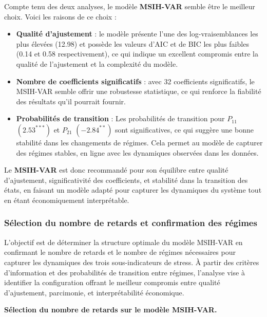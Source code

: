 Compte tenu des deux analyses, le modèle \textbf{MSIH-VAR} semble être le meilleur choix. Voici les raisons de ce choix :

\begin{itemize}
    \item \textbf{Qualité d'ajustement} : le modèle présente l'une des log-vraisemblances les plus élevées (12.98) et possède les valeurs d'AIC et de BIC les plus faibles (0.14 et 0.58 respectivement), ce qui indique un excellent compromis entre la qualité de l'ajustement et la complexité du modèle.

    \item \textbf{Nombre de coefficients significatifs} : avec 32 coefficients significatifs, le MSIH-VAR semble offrir une robustesse statistique, ce qui renforce la fiabilité des résultats qu'il pourrait fournir.

    \item \textbf{Probabilités de transition} : Les probabilités de transition pour \( P_{11} \) \( (2.53^{***}) \) et \( P_{21} \)  \( (-2.84^{**}) \) sont significatives, ce qui suggère une bonne stabilité dans les changements de régimes. Cela permet au modèle de capturer des régimes stables, en ligne avec les dynamiques observées dans les données.
\end{itemize}

Le \textbf{MSIH-VAR} est donc recommandé pour son équilibre entre qualité d’ajustement, significativité des coefficients, et stabilité dans la transition des états, en faisant un modèle adapté pour capturer les dynamiques du système tout en étant économiquement interprétable.\\

\subsubsection{Sélection du nombre de retards et confirmation des régimes}

L’objectif est de déterminer la structure optimale du modèle MSIH-VAR en confirmant le nombre de retards et le nombre de régimes nécessaires pour capturer les dynamiques des trois sous-indicateurs de stress. À partir des critères d’information et des probabilités de transition entre régimes, l’analyse vise à identifier la configuration offrant le meilleur compromis entre qualité d’ajustement, parcimonie, et interprétabilité économique.

\textbf{Sélection du nombre de retards sur le modèle MSIH-VAR.}

